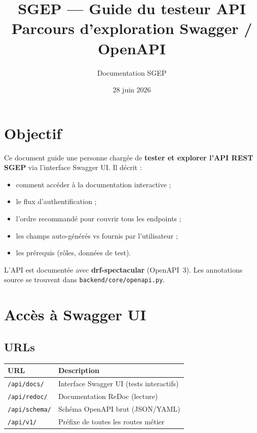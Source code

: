 \documentclass[11pt,a4paper]{article}
\title{SGEP --- Guide du testeur API\\
\large Parcours d'exploration Swagger / OpenAPI}
\author{Documentation SGEP}
\date{28 juin 2026}
\begin{document}
\maketitle
\tableofcontents
\newpage

\section{Objectif}

Ce document guide une personne chargée de \textbf{tester et explorer l'API REST SGEP} via l'interface Swagger UI. Il décrit :
\begin{itemize}[noitemsep]
    \item comment accéder à la documentation interactive ;
    \item le flux d'authentification ;
    \item l'ordre recommandé pour couvrir tous les endpoints ;
    \item les champs auto-générés vs fournis par l'utilisateur ;
    \item les prérequis (rôles, données de test).
\end{itemize}

L'API est documentée avec \textbf{drf-spectacular} (OpenAPI~3). Les annotations source se trouvent dans \texttt{backend/core/openapi.py}.

\section{Accès à Swagger UI}

\subsection{URLs}

\begin{table}[h]
\centering
\begin{tabular}{ll}
\toprule
\textbf{URL} & \textbf{Description} \\
\midrule
\texttt{/api/docs/} & Interface Swagger UI (tests interactifs) \\
\texttt{/api/redoc/} & Documentation ReDoc (lecture) \\
\texttt{/api/schema/} & Schéma OpenAPI brut (JSON/YAML) \\
\texttt{/api/v1/} & Préfixe de toutes les routes métier \\
\bottomrule
\end{tabular}
\end{table}
\end{document}
